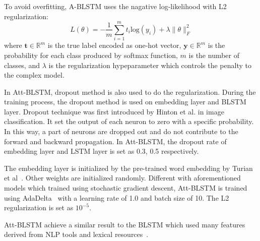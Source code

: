 To avoid overfitting, A-BLSTM uses the nagative log-likelihood with L2 regularization:
\begin{equation}
L(\theta) = - \frac{1}{m} \sum_{i=1}^{m} t_i \mbox{log}(y_i) + \lambda \| \theta \|^2_F
\end{equation}
where $\mathbf{t}\in \mathbb{R}^m$ is the true label encoded as one-hot vector, $\mathbf{y}\in \mathbb{R}^m$ is the probability for each class produced by softmax function, $m$ is the number of classes, and $\lambda$ is the regularization hypeparameter which controls the penalty to the complex model.

In Att-BLSTM, dropout method is also used to do the regularization. During the training process, the dropout method is used on embedding layer and BLSTM layer. Dropout technique was first introduced by Hinton et al. in image classification\cite{krizhevsky2012imagenet}. It set the output of each neuron to zero with a specific probability. In this way, a part of neurons are dropped out and do not contribute to the forward and backward propagation. In Att-BLSTM, the dropout rate of embedding layer and LSTM layer is set as 0.3, 0.5 respectively.

The embedding layer is initialized by the pre-trained word embedding by Turian et al~\cite{turian2010word}. Other weights are initialized randomly. Different with aforementioned models which trained using stochastic gradient descent, Att-BLSTM is trained using AdaDelta~\cite{zeiler2012adadelta} with a learning rate of 1.0 and batch size of 10. The L2 regularization is set as $10^{-5}$.

Att-BLSTM achieve a similar result to the BLSTM which used many features derived from NLP tools and lexical resources~\cite{Zhang2015}. 



